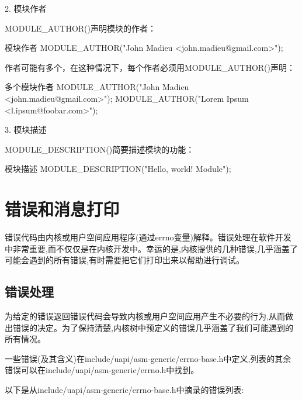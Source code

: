 \documentclass[lang=cn,newtx,10pt,scheme=chinese]{elegantbook}
\begin{document}
2. 模块作者

MODULE\_AUTHOR()声明模块的作者：

\begin{mycode}{模块作者}
MODULE_AUTHOR("John Madieu <john.madieu@gmail.com>");
\end{mycode}

作者可能有多个，在这种情况下，每个作者必须用MODULE\_AUTHOR()声明：

\begin{mycode}{多个模块作者}
MODULE_AUTHOR("John Madieu <john.madieu@gmail.com>");
MODULE_AUTHOR("Lorem Ipsum <l.ipsum@foobar.com>");
\end{mycode}

3. 模块描述

MODULE\_DESCRIPTION()简要描述模块的功能：

\begin{mycode}{模块描述}
MODULE_DESCRIPTION("Hello, world! Module");
\end{mycode}

\section{错误和消息打印}

错误代码由内核或用户空间应用程序(通过errno变量)解释。错误处理在软件开发中非常重要,而不仅仅是在内核开发中。幸运的是,内核提供的几种错误,几乎涵盖了可能会遇到的所有错误,有时需要把它们打印出来以帮助进行调试。

\subsection{错误处理}

为给定的错误返回错误代码会导致内核或用户空间应用产生不必要的行为,从而做出错误的决定。为了保持清楚,内核树中预定义的错误几乎涵盖了我们可能遇到的所有情况。

一些错误(及其含义)在include/uapi/asm-generic/errno-base.h中定义,列表的其余错误可以在include/uapi/asm-generic/errno.h中找到。

以下是从include/uapi/asm-generic/errno-base.h中摘录的错误列表:
\end{document}
